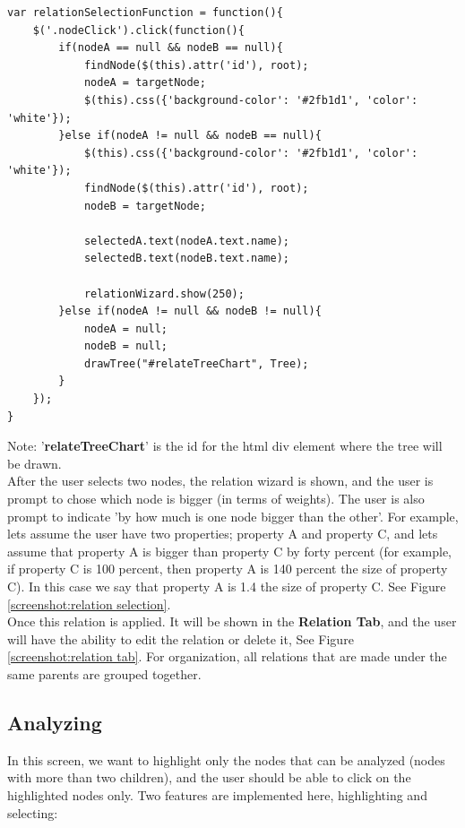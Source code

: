 \documentclass[11pt]{article} %
\begin{document}
\noindent
\begin{minipage}[c]{\linewidth}
\begin{lstlisting}[basicstyle=\scriptsize, tabsize=4, frame=single, caption=Relation selection function, label=code:relationSelectionFunction]
var relationSelectionFunction = function(){
	$('.nodeClick').click(function(){
		if(nodeA == null && nodeB == null){
			findNode($(this).attr('id'), root);
			nodeA = targetNode;
			$(this).css({'background-color': '#2fb1d1', 'color': 'white'});
		}else if(nodeA != null && nodeB == null){
			$(this).css({'background-color': '#2fb1d1', 'color': 'white'});
			findNode($(this).attr('id'), root);
			nodeB = targetNode;
			
			selectedA.text(nodeA.text.name);
			selectedB.text(nodeB.text.name);
			
			relationWizard.show(250);
		}else if(nodeA != null && nodeB != null){
			nodeA = null;
			nodeB = null;			
			drawTree("#relateTreeChart", Tree);
		}
	});	
}

\end{lstlisting}
\end{minipage}
Note: '\textbf{relateTreeChart}' is the id for the html div element where the tree will be drawn.\\[12pt]

After the user selects two nodes, the relation wizard is shown, and the user is prompt to chose which node is bigger (in terms of weights). The user is also prompt to indicate 'by how much is one node bigger than the other'. For example, lets assume the user have two properties; property A and property C, and lets assume that property A is bigger than property C by forty percent (for example, if property C is 100 percent, then property A is 140 percent the size of property C). In this case we say that property A is 1.4 the size of property C. See Figure \ref{screenshot:relation selection}.\\
Once this relation is applied. It will be shown in the \textbf{Relation Tab}, and the user will have the ability to edit the relation or delete it, See Figure \ref{screenshot:relation tab}. For organization, all relations that are made under the same parents are grouped together.
\subsection{Analyzing}
In this screen, we want to highlight only the nodes that can be analyzed (nodes with more than two children), and the user should be able to click on the highlighted nodes only. Two features are implemented here, highlighting and selecting:
\end{document}
